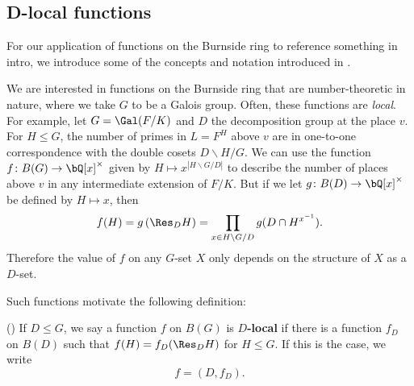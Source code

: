 

\subsection{D-local functions}\label{D-loc}

For our application of functions on the Burnside ring to {\color{red} reference something in intro}, we introduce some of the concepts and notation introduced in \cite[Section 2.iii]{reg-const}.

We are interested in functions on the Burnside ring that are number-theoretic in nature, where we take $G$ to be a Galois group. Often, these functions are \textit{local}. For example, let $G = \Gal(F / K)$ and $D$ the decomposition group at the place $v$. For $H \leq G$, the number of primes in $L = F^{H}$ above $v$ are in one-to-one correspondence with the double cosets $D \backslash H / G$. We can use the function $f \colon B(G) \to \bQ[x]^{\times}$ given by $H \mapsto  x^{| H \backslash G / D|}$ to describe the number of places above $v$ in any intermediate extension of $F / K$. But if we let $g \colon B(D) \to \bQ[x]^{\times}$ be defined by $H \mapsto x$, then 
        \[ f(H) = g\left(\Res_D H\right) = \prod_{x \in H \backslash G / D} g(D \cap H^{x^{-1}}) .\]
Therefore the value of $f$ on any $G$-set $X$ only depends on the structure of $X$ as a $D$-set. 

Such functions motivate the following definition:

\begin{defn}(\cite[Definition 2.33]{reg-const})\label{D-loc-fn}
    If $D \leq G$, we say a function $f$ on $B(G)$ is \textbf{$D$-local} if there is a function $f_D$ on $B(D)$ such that $f(H) = f_D(\Res_D H)$ for $H \leq G$.
    If this is the case, we write
    \[ f = (D, f_D). \]
\end{defn}

